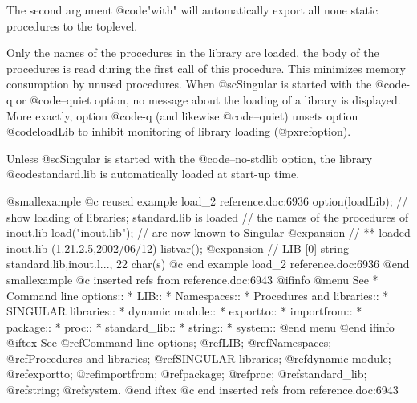 {{{{{{{{The second argument @code{"with"} will automatically export all none
static procedures to the toplevel.


Only the names of the procedures in the library are loaded, the body of
the procedures is read during the first call of this procedure. This minimizes
memory consumption by unused procedures.  When @sc{Singular} is started
with the @code{-q} or @code{--quiet} option, no message about the
loading of a library is displayed.  More exactly, option @code{-q} (and
likewise @code{--quiet}) unsets option @code{loadLib} to inhibit
monitoring of library loading (@pxref{option}).

Unless  @sc{Singular} is started with the @code{--no-stdlib} option, the
library @code{standard.lib} is automatically loaded at start-up time.

@smallexample
@c reused example load_2 reference.doc:6936 
  option(loadLib); // show loading of libraries; standard.lib is loaded
                   // the names of the procedures of inout.lib
  load("inout.lib"); // are now known to Singular
@expansion{} // ** loaded inout.lib (1.21.2.5,2002/06/12)
  listvar();
@expansion{} // LIB                  [0]  string standard.lib,inout.l..., 22 char(s)
@c end example load_2 reference.doc:6936
@end smallexample
@c inserted refs from reference.doc:6943
@ifinfo
@menu
See
* Command line options::
* LIB::
* Namespaces::
* Procedures and libraries::
* SINGULAR libraries::
* dynamic module::
* exportto::
* importfrom::
* package::
* proc::
* standard_lib::
* string::
* system::
@end menu
@end ifinfo
@iftex
See
@ref{Command line options};
@ref{LIB};
@ref{Namespaces};
@ref{Procedures and libraries};
@ref{SINGULAR libraries};
@ref{dynamic module};
@ref{exportto};
@ref{importfrom};
@ref{package};
@ref{proc};
@ref{standard_lib};
@ref{string};
@ref{system}.
@end iftex
@c end inserted refs from reference.doc:6943

}}}}}}}}
